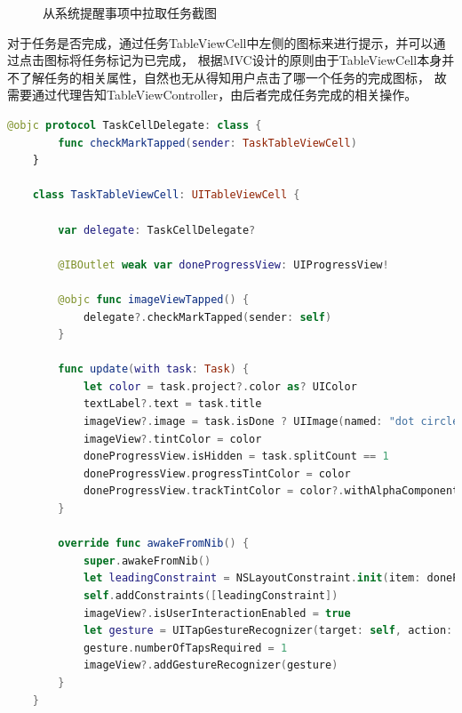\begin{figure}[H]
	\centering
	\caption{从系统提醒事项中拉取任务截图}
\end{figure}

对于任务是否完成，通过任务TableViewCell中左侧的图标来进行提示，并可以通过点击图标将任务标记为已完成，
根据MVC设计的原则由于TableViewCell本身并不了解任务的相关属性，自然也无从得知用户点击了哪一个任务的完成图标，
故需要通过代理告知TableViewController，由后者完成任务完成的相关操作。

\begin{lstlisting}[language={Swift}, caption={TaskTableViewCell}]
	@objc protocol TaskCellDelegate: class {
		func checkMarkTapped(sender: TaskTableViewCell)
	}

	class TaskTableViewCell: UITableViewCell {
		
		var delegate: TaskCellDelegate?
		
		@IBOutlet weak var doneProgressView: UIProgressView!
		
		@objc func imageViewTapped() {
			delegate?.checkMarkTapped(sender: self)
		}
		
		func update(with task: Task) {
			let color = task.project?.color as? UIColor
			textLabel?.text = task.title
			imageView?.image = task.isDone ? UIImage(named: "dot circle") : UIImage(named: "circle")
			imageView?.tintColor = color
			doneProgressView.isHidden = task.splitCount == 1
			doneProgressView.progressTintColor = color
			doneProgressView.trackTintColor = color?.withAlphaComponent(0.1)
		}
		
		override func awakeFromNib() {
			super.awakeFromNib()
			let leadingConstraint = NSLayoutConstraint.init(item: doneProgressView!, attribute: .leading, relatedBy: .equal, toItem: textLabel, attribute: .leading, multiplier: 1.0, constant: 0)
			self.addConstraints([leadingConstraint])
			imageView?.isUserInteractionEnabled = true
			let gesture = UITapGestureRecognizer(target: self, action: #selector(imageViewTapped))
			gesture.numberOfTapsRequired = 1
			imageView?.addGestureRecognizer(gesture)
		}
	}
\end{lstlisting}

